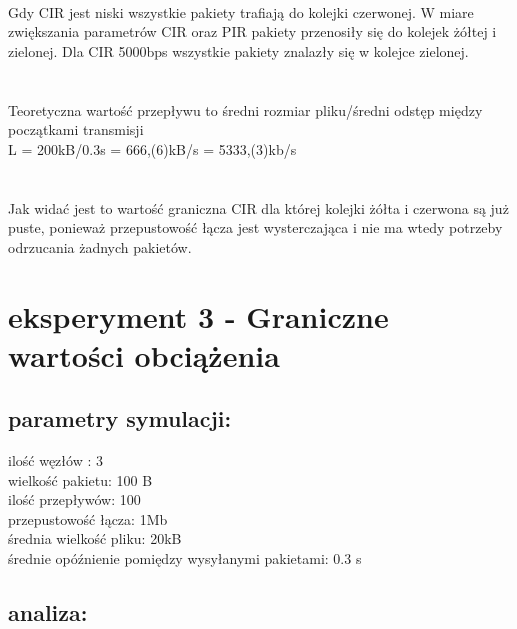 \documentclass[a4paper]{article}
\begin{document}
\paragraph{}
Gdy CIR jest niski wszystkie pakiety trafiają do kolejki czerwonej. W miare zwiększania parametrów CIR oraz PIR pakiety przenosiły się do kolejek żółtej i zielonej. Dla CIR 5000bps wszystkie pakiety znalazły się w kolejce zielonej.\\
\\

\paragraph{}
Teoretyczna wartość przepływu to średni rozmiar pliku/średni odstęp między początkami transmisji\\
L = 200kB/0.3s = 666,(6)kB/s = 5333,(3)kb/s\\
\\

\paragraph{}
Jak widać jest to wartość graniczna CIR dla której kolejki żółta i czerwona są już puste, ponieważ przepustowość łącza jest wysterczająca i nie ma wtedy potrzeby odrzucania żadnych pakietów.

\section{eksperyment 3 - Graniczne wartości obciążenia}


\subsection{parametry symulacji:}

ilość węzłów : 3\\
wielkość pakietu: 100 B\\
ilość przepływów: 100\\
przepustowość łącza: 1Mb\\
średnia wielkość pliku: 20kB\\
średnie opóźnienie pomiędzy wysyłanymi pakietami: 0.3 s\\

\subsection{analiza:}
\end{document}
